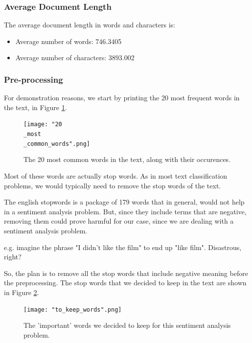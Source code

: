 \documentclass[10pt, a4paper]{article}
\begin{document}
	
	\subsubsection{Average Document Length }
	
	The average document length in words and characters is:
	\begin{itemize}
		\item Average number of words: 746.3405
		\item Average number of characters: 3893.002
	\end{itemize}
	
	
	
	
	\subsubsection{Pre-processing}
	
	For demonstration reasons, we start by printing the 20 most frequent words in the text, in Figure \ref{fig::20_common}.
	
	\begin{figure}
		\centering
		\texttt{[image: "20\\\_most\\\_common\_words".png]}
		\caption{The 20 most common words in the text, along with their occurences.}
		\label{fig::20_common}
	\end{figure}
	
	
	
	Most of these words are actually stop words. As in most text classification problems, we would typically need to remove the stop words of the text.
	
	The english stopwords is a package of 179 words that in general, would not help in a sentiment analysis problem. But, since they include terms that are negative, removing them could prove harmful for our case, since we are dealing with a sentiment analysis problem.
	
	e.g. imagine the phrase "I didn't like the film" to end up "like film". Disastrous, right?
	
	So, the plan is to remove all the stop words that include negative meaning before the preprocessing.
	The stop words that we decided to keep in the text are shown in Figure \ref{fig::to_keep}.
	
	\begin{figure}
		\centering
		\texttt{[image: "to\_keep\_words".png]}
		\caption{The 'important' words we decided to keep for this sentiment analysis problem.}
		\label{fig::to_keep}
	\end{figure}
	
\end{document}
